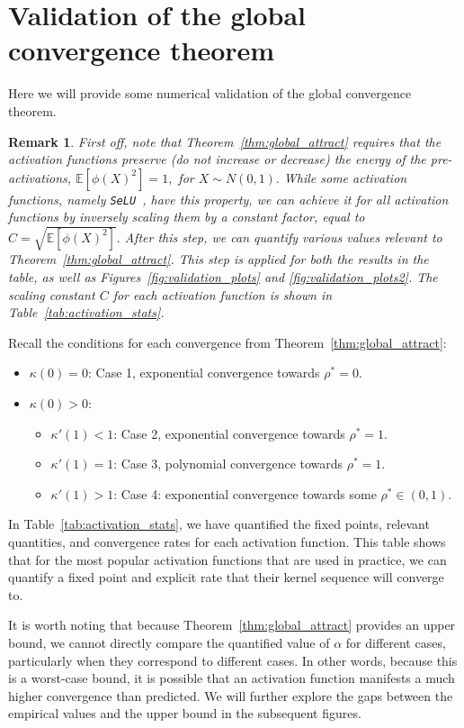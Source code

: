 \documentclass[twoside]{article}
\newtheorem{remark}{Remark}
\theoremstyle{definition}
\begin{document}
\section{Validation of the global convergence theorem}\label{sec:experiments}
Here we will provide some numerical validation of the global convergence theorem. 

\begin{remark}\label{rem:act-normalization}
    First off, note that Theorem~\ref{thm:global_attract} requires that the activation functions preserve (do not increase or decrease) the energy of the pre-activations, $\mathbb{E}[\phi(X)^2] = 1,$ for $X\sim N(0,1).$ While some activation functions, namely \texttt{SeLU}~\cite{klambauer2017self}, have this property, we can achieve it for all activation functions by inversely scaling them by a constant factor, equal to $C = \sqrt{\mathbb{E}[\phi(X)^2]}.$ After this step, we can quantify various values relevant to Theorem~\ref{thm:global_attract}. This step is applied for both the results in the table, as well as Figures~\ref{fig:validation_plots} and \ref{fig:validation_plots2}. The scaling constant $C$ for each activation function is shown in Table~\ref{tab:activation_stats}.
\end{remark}

Recall the conditions for each convergence from Theorem~\ref{thm:global_attract}:
\begin{itemize}
    \item $\kappa(0)=0$: Case 1, exponential convergence towards $\rho^*=0.$
    \item $\kappa(0)>0$:
    \begin{itemize}
        \item $\kappa'(1)<1$: Case 2, exponential convergence towards $\rho^*=1.$
        \item $\kappa'(1)=1$: Case 3, polynomial convergence towards $\rho^*=1.$
        \item $\kappa'(1)>1$: Case 4: exponential convergence towards some $\rho^*\in (0,1).$
    \end{itemize}
\end{itemize}
In Table~\ref{tab:activation_stats}, we have quantified the fixed points, relevant quantities, and convergence rates for each activation function. This table shows that for the most popular activation functions that are used in practice, we can quantify a fixed point and explicit rate that their kernel sequence will converge to. 

It is worth noting that because Theorem~\ref{thm:global_attract} provides an upper bound, we cannot directly compare the quantified value of $\alpha$ for different cases, particularly when they correspond to different cases. In other words, because this is a worst-case bound, it is possible that an activation function manifests a much higher convergence than predicted. We will further explore the gaps between the empirical values and the upper bound in the subsequent figures. 
\end{document}
